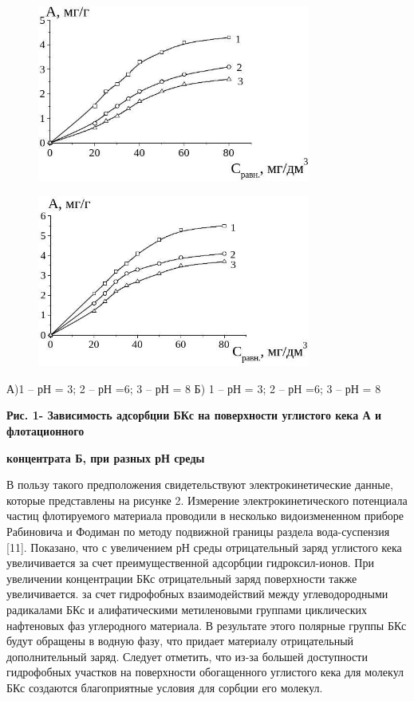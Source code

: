 \begin{figure}[H]
	\centering
	\includegraphics[width=0.8\textwidth]{assets/1033}
	\caption*{}
\end{figure}\begin{figure}[H]
	\centering
	\includegraphics[width=0.8\textwidth]{assets/1034}
	\caption*{}
\end{figure}

А)1 -- рН = 3; 2 -- рН =6; 3 -- рН = 8 Б) 1 -- рН = 3; 2 -- рН =6; 3 --
рН = 8

{\bfseries Рис. 1- Зависимость адсорбции БКс на поверхности углистого кека
А и флотационного}

{\bfseries концентрата Б, при разных рН среды}

В пользу такого предположения свидетельствуют электрокинетические
данные, которые представлены на рисунке 2. Измерение
электрокинетического потенциала частиц флотируемого материала проводили
в несколько видоизмененном приборе Рабиновича и Фодиман по методу
подвижной границы раздела вода-суспензия {[}11{]}. Показано, что с
увеличением рН среды отрицательный заряд углистого кека увеличивается за
счет преимущественной адсорбции гидроксил-ионов. При увеличении
концентрации БКс отрицательный заряд поверхности также увеличивается. за
счет гидрофобных взаимодействий между углеводородными радикалами БКс и
алифатическими метиленовыми группами циклических нафтеновых фаз
углеродного материала. В результате этого полярные группы БКс будут
обращены в водную фазу, что придает материалу отрицательный
дополнительный заряд. Следует отметить, что из-за большей доступности
гидрофобных участков на поверхности обогащенного углистого кека для
молекул БКс создаются благоприятные условия для сорбции его молекул.

